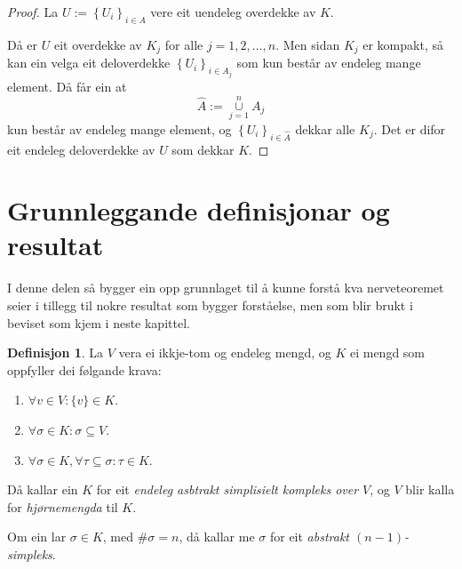 \documentclass[a4paper, 12pt, norsk]{article}
\theoremstyle{plain}
\theoremstyle{definition}
\newtheorem{definition}[theorem]{Definisjon}
\newcommand{\union}{ \mathop{\cup}\limits }
\newcommand{\set}[1]{ \left\{ #1 \right\} } %
\begin{document}
\begin{proof}
	La \( U := \set{U_i}_{i \in A} \) vere eit uendeleg overdekke av \( K \).

	Då er \( U \) eit overdekke av \( K_j \) for alle \( j = 1, 2, \dots, n \). Men sidan \( K_j \) er kompakt, så kan ein velga eit deloverdekke \( \set{U_i}_{i \in A_j} \) som kun består av endeleg mange element. Då får ein at
	\[
		\hat{A} := \union_{j = 1}^n A_j
	\]
	kun består av endeleg mange element, og \( \set{U_i}_{i \in \hat{A}} \) dekkar alle \( K_j \). Det er difor eit endeleg deloverdekke av \( U \) som dekkar \( K \).
\end{proof}

\section{Grunnleggande definisjonar og resultat}

I denne delen så bygger ein opp grunnlaget til å kunne forstå kva nerveteoremet seier i tillegg til nokre resultat som bygger forståelse, men som blir brukt i beviset som kjem i neste kapittel.

\begin{definition} \label{def:ASK}
	La $V$ vera ei ikkje-tom og endeleg mengd, og \( K \) ei mengd som oppfyller dei følgande krava: 
	\begin{enumerate}
		\item{$\forall v \in V: \{v\} \in K$.}
		\item{\( \forall \sigma \in K: \sigma \subseteq V \).}
		\item{$\forall \sigma \in K, \forall \tau \subseteq \sigma: \tau \in K$.}
	\end{enumerate}

	Då kallar ein $K$ for eit \emph{endeleg asbtrakt simplisielt kompleks over $V$}, og $V$ blir kalla for \emph{hjørnemengda} til $K$.

	Om ein lar \( \sigma \in K \), med \( \#\sigma = n \), då kallar me \( \sigma \) for eit \emph{abstrakt \( (n-1) \)-simpleks}.
\end{definition}
\end{document}
